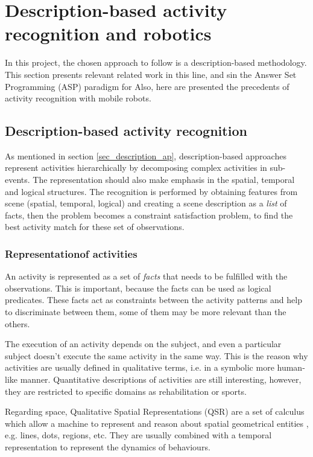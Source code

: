 \section{Description-based activity recognition and robotics}

In this project, the chosen approach to follow is a description-based methodology. 
This section presents relevant related work in this line, and sin the Answer Set Programming (ASP) paradigm for 
Also, here are presented the precedents of activity recognition with mobile robots.

\subsection{Description-based activity recognition}

As mentioned in section \ref{sec_description_ap}, description-based approaches represent activities hierarchically by decomposing complex activities in sub-events.
The representation should also make emphasis in the spatial, temporal and logical structures.
The recognition is performed by obtaining features from scene (spatial, temporal, logical) and creating a scene description as a \textit{list} of facts, then the problem becomes a constraint satisfaction problem, to find the best activity match for these set of observations. 

\subsubsection{Representationof activities}

An activity is represented as a set of \textit{facts} that needs to be fulfilled with the observations.
This is important, because the facts can be used as logical predicates.
These facts act as constraints between the activity patterns and help to discriminate between them, some of them may be more relevant than the others.

The execution of an activity depends on the subject, and even a particular subject doesn't execute the same activity in the same way.
This is the reason why activities are usually defined in qualitative terms, i.e. in a symbolic more human-like manner.
Quantitative descriptions of activities are still interesting, however, they are restricted to specific domains as rehabilitation or sports.

Regarding space, Qualitative Spatial Representations (QSR) are a set of calculus which allow a machine to represent and reason about spatial geometrical entities \citep{Cohn2008_QSRR}, e.g. lines, dots, regions, etc.
They are usually combined with a temporal representation to represent the dynamics of behaviours.

